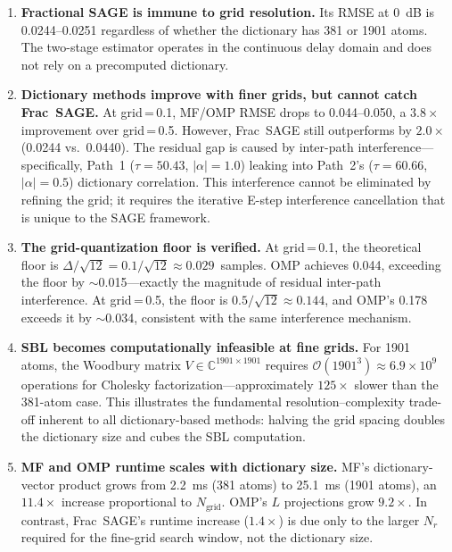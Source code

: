 \documentclass[11pt,a4paper]{article}
\begin{document}
\begin{enumerate}
\item \textbf{Fractional SAGE is immune to grid resolution.} Its RMSE at \SI{0}{dB} is 0.0244--0.0251 regardless of whether the dictionary has 381 or 1901 atoms. The two-stage estimator operates in the continuous delay domain and does not rely on a precomputed dictionary.

\item \textbf{Dictionary methods improve with finer grids, but cannot catch Frac~SAGE.} At grid$\,$=$\,$0.1, MF/OMP RMSE drops to 0.044--0.050, a $3.8\times$ improvement over grid$\,$=$\,$0.5. However, Frac~SAGE still outperforms by $2.0\times$ (0.0244 vs.\ 0.0440). The residual gap is caused by inter-path interference---specifically, Path~1 ($\tau=50.43$, $|\alpha|=1.0$) leaking into Path~2's ($\tau=60.66$, $|\alpha|=0.5$) dictionary correlation. This interference cannot be eliminated by refining the grid; it requires the iterative E-step interference cancellation that is unique to the SAGE framework.

\item \textbf{The grid-quantization floor is verified.} At grid$\,$=$\,$0.1, the theoretical floor is $\Delta/\sqrt{12} = 0.1/\sqrt{12} \approx 0.029$~samples. OMP achieves 0.044, exceeding the floor by $\sim$0.015---exactly the magnitude of residual inter-path interference. At grid$\,$=$\,$0.5, the floor is $0.5/\sqrt{12} \approx 0.144$, and OMP's 0.178 exceeds it by $\sim$0.034, consistent with the same interference mechanism.

\item \textbf{SBL becomes computationally infeasible at fine grids.} For 1901 atoms, the Woodbury matrix $V \in \mathbb{C}^{1901\times 1901}$ requires $\mathcal{O}(1901^3) \approx 6.9\times 10^9$ operations for Cholesky factorization---approximately $125\times$ slower than the 381-atom case. This illustrates the fundamental resolution--complexity trade-off inherent to all dictionary-based methods: halving the grid spacing doubles the dictionary size and cubes the SBL computation.

\item \textbf{MF and OMP runtime scales with dictionary size.} MF's dictionary-vector product grows from \SI{2.2}{ms} (381 atoms) to \SI{25.1}{ms} (1901 atoms), an $11.4\times$ increase proportional to $N_{\text{grid}}$. OMP's $L$ projections grow $9.2\times$. In contrast, Frac~SAGE's runtime increase ($1.4\times$) is due only to the larger $N_r$ required for the fine-grid search window, not the dictionary size.
\end{enumerate}
\end{document}
